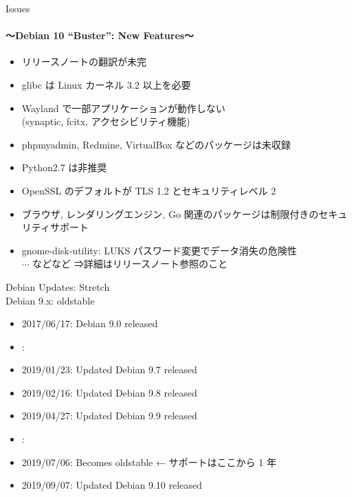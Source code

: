 \documentclass[cjk,c,squeeze,shrink,dvipdfmx,12pt,handout]{beamer}
\begin{document}
\begin{frame}[fragile]{Issues}
  \framesubtitle{〜Debian 10 ``Buster'': New Features〜}
  \pause
  \begin{itemize}[<+->]
  \item リリースノートの翻訳が未完
  \item glibc は Linux カーネル 3.2 以上を必要
  \item Wayland で一部アプリケーションが動作しない\\
    (synaptic, fcitx, アクセシビリティ機能)
  \item phpmyadmin, Redmine, VirtualBox などのパッケージは未収録
  \item Python2.7 は非推奨
  \item OpenSSL のデフォルトが TLS 1.2 とセキュリティレベル 2
  \item ブラウザ, レンダリングエンジン, Go 関連のパッケージは制限付きのセキュリティサポート
  \item gnome-disk-utility: LUKS パスワード変更でデータ消失の危険性
    \\
    $\cdots$ などなど \hfill ⇒詳細はリリースノート参照のこと
  \end{itemize}
\end{frame}

\begin{frame}[fragile]{%
    Debian Updates: Stretch%
    \\[-.5em]{\normalsize{Debian 9.x: oldstable}}
  }
  \pause
  \begin{itemize}[<+->]
  \item 2017/06/17: Debian 9.0 released
  \item[] :
  \item 2019/01/23: Updated Debian 9.7 released
  \item 2019/02/16: Updated Debian 9.8 released
  \item 2019/04/27: Updated Debian 9.9 released
  \item[] :
  \item \alert{2019/07/06: Becomes oldstable} ← サポートはここから 1 年
  \item 2019/09/07: Updated Debian 9.10 released
  \end{itemize}
\end{frame}


\end{document}
